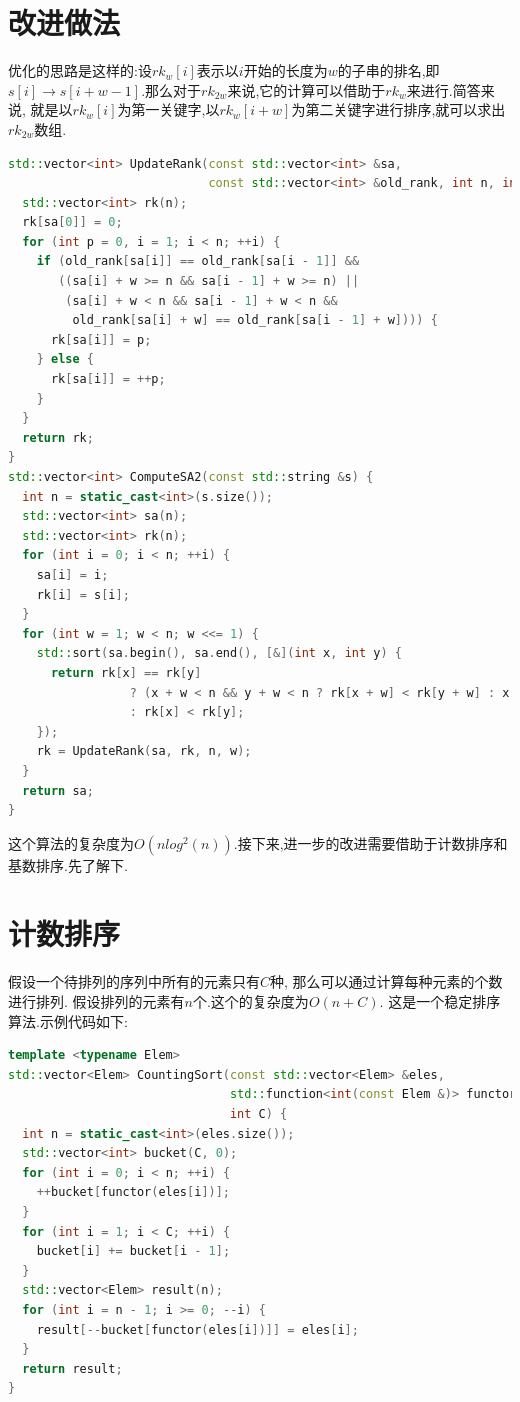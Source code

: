 \documentclass{article}
\begin{document}
\section{改进做法}
优化的思路是这样的:设$rk_{w}[i]$表示以$i$开始的长度为$w$的子串的排名,即$s[i]\rightarrow s[i+w-1]$.那么对于$rk_{2w}$来说,它的计算可以借助于$rk_{w}$来进行.简答来说, 就是以$rk_{w}[i]$为第一关键字,以$rk_{w}[i+w]$为第二关键字进行排序,就可以求出$rk_{2w}$数组.
\begin{lstlisting}[language=C++, caption={Better}]
std::vector<int> UpdateRank(const std::vector<int> &sa,
                            const std::vector<int> &old_rank, int n, int w) {
  std::vector<int> rk(n);
  rk[sa[0]] = 0;
  for (int p = 0, i = 1; i < n; ++i) {
    if (old_rank[sa[i]] == old_rank[sa[i - 1]] &&
       ((sa[i] + w >= n && sa[i - 1] + w >= n) ||
        (sa[i] + w < n && sa[i - 1] + w < n &&
         old_rank[sa[i] + w] == old_rank[sa[i - 1] + w]))) {
      rk[sa[i]] = p;
    } else {
      rk[sa[i]] = ++p;
    }
  }
  return rk;
}
std::vector<int> ComputeSA2(const std::string &s) {
  int n = static_cast<int>(s.size());
  std::vector<int> sa(n);
  std::vector<int> rk(n);
  for (int i = 0; i < n; ++i) {
    sa[i] = i;
    rk[i] = s[i];
  }
  for (int w = 1; w < n; w <<= 1) {
    std::sort(sa.begin(), sa.end(), [&](int x, int y) {
      return rk[x] == rk[y]
                 ? (x + w < n && y + w < n ? rk[x + w] < rk[y + w] : x + w >= n)
                 : rk[x] < rk[y];
    });
    rk = UpdateRank(sa, rk, n, w);
  }
  return sa;
}
\end{lstlisting}
这个算法的复杂度为$O(nlog^{2}(n))$.接下来,进一步的改进需要借助于计数排序和基数排序.先了解下.

\section{计数排序}
假设一个待排列的序列中所有的元素只有$C$种, 那么可以通过计算每种元素的个数进行排列. 假设排列的元素有$n$个.这个的复杂度为$O(n+C)$. 这是一个稳定排序算法.示例代码如下: \par
\begin{lstlisting}[language=C++, caption={Counting Sort}]
template <typename Elem>
std::vector<Elem> CountingSort(const std::vector<Elem> &eles,
                               std::function<int(const Elem &)> functor,
                               int C) {
  int n = static_cast<int>(eles.size());
  std::vector<int> bucket(C, 0);
  for (int i = 0; i < n; ++i) {
    ++bucket[functor(eles[i])];
  }
  for (int i = 1; i < C; ++i) {
    bucket[i] += bucket[i - 1];
  }
  std::vector<Elem> result(n);
  for (int i = n - 1; i >= 0; --i) {
    result[--bucket[functor(eles[i])]] = eles[i];
  }
  return result;
}
\end{lstlisting}
\end{document}
